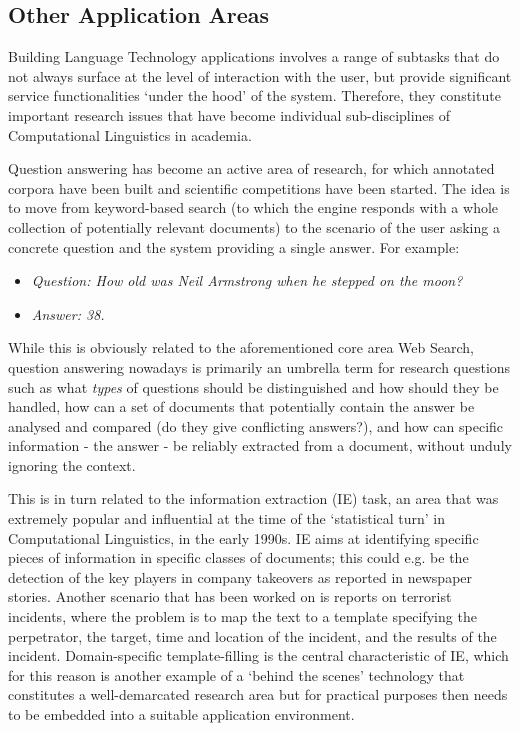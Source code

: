 \begin{multicols}{2}
\subsection{Other Application Areas}
    Building Language Technology applications involves a range of subtasks that do not always surface at the level of interaction with the user,  but provide significant service functionalities ‘under the hood’ of the system. Therefore, they constitute important research issues that have become individual sub-disciplines of Computational Linguistics in academia. 

Question answering has become an active area of research, for which annotated corpora have been built and scientific competitions have been started. The idea is to move from keyword-based search (to which the engine responds with a whole collection of potentially relevant documents) to the scenario of the user asking a concrete question and the system providing a single answer. For example:

\begin{itemize}
\item[] \textit{Question: How old was Neil Armstrong when he stepped on the moon?}
\item[] \textit{Answer: 38.}
\end{itemize}

While this is obviously related to the aforementioned core area Web Search, question answering nowadays is primarily an umbrella term for research questions such as what \textit{types} of questions should be distinguished and how should they be handled, how can a set of documents that potentially contain the answer be analysed and compared (do they give conflicting answers?), and how can specific information - the answer - be reliably extracted from a document, without unduly ignoring the context. 


This is in turn related to the information extraction (IE) task, an area that was extremely popular and influential at the time of the ‘statistical turn’ in Computational Linguistics, in the early 1990s. IE aims at identifying specific pieces of information in specific classes of documents; this could e.g. be the detection of the key players in company takeovers as reported in newspaper stories. Another scenario that has been worked on is reports on terrorist incidents, where the problem is to map the text to a template specifying the perpetrator, the target, time and location of the incident, and the results of the incident. Domain-specific template-filling is the central characteristic of IE, which for this reason is another example of a ‘behind the scenes’ technology that constitutes a well-demarcated research area but for practical purposes then needs to be embedded into a suitable application environment. 


\end{multicols}
